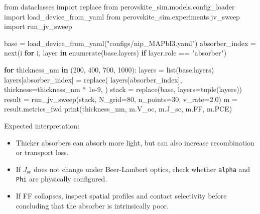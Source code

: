 \documentclass[
  11pt,
  american,
]{report}
\newenvironment{Shaded}{}{}
\newcommand{\BuiltInTok}[1]{#1}
\newcommand{\ControlFlowTok}[1]{\textcolor[rgb]{0.00,0.44,0.13}{\textbf{#1}}}
\newcommand{\DecValTok}[1]{\textcolor[rgb]{0.25,0.63,0.44}{#1}}
\newcommand{\FloatTok}[1]{\textcolor[rgb]{0.25,0.63,0.44}{#1}}
\newcommand{\ImportTok}[1]{#1}
\newcommand{\KeywordTok}[1]{\textcolor[rgb]{0.00,0.44,0.13}{\textbf{#1}}}
\newcommand{\NormalTok}[1]{#1}
\newcommand{\OperatorTok}[1]{\textcolor[rgb]{0.40,0.40,0.40}{#1}}
\newcommand{\StringTok}[1]{\textcolor[rgb]{0.25,0.44,0.63}{#1}}
\providecommand{\tightlist}{%
  \setlength{\itemsep}{0pt}\setlength{\parskip}{0pt}}
\begin{document}
\begin{Shaded}
\begin{Highlighting}[]
\ImportTok{from}\NormalTok{ dataclasses }\ImportTok{import}\NormalTok{ replace}
\ImportTok{from}\NormalTok{ perovskite\_sim.models.config\_loader }\ImportTok{import}\NormalTok{ load\_device\_from\_yaml}
\ImportTok{from}\NormalTok{ perovskite\_sim.experiments.jv\_sweep }\ImportTok{import}\NormalTok{ run\_jv\_sweep}

\NormalTok{base }\OperatorTok{=}\NormalTok{ load\_device\_from\_yaml(}\StringTok{"configs/nip\_MAPbI3.yaml"}\NormalTok{)}
\NormalTok{absorber\_index }\OperatorTok{=} \BuiltInTok{next}\NormalTok{(i }\ControlFlowTok{for}\NormalTok{ i, layer }\KeywordTok{in} \BuiltInTok{enumerate}\NormalTok{(base.layers)}
                      \ControlFlowTok{if}\NormalTok{ layer.role }\OperatorTok{==} \StringTok{"absorber"}\NormalTok{)}

\ControlFlowTok{for}\NormalTok{ thickness\_nm }\KeywordTok{in}\NormalTok{ (}\DecValTok{200}\NormalTok{, }\DecValTok{400}\NormalTok{, }\DecValTok{700}\NormalTok{, }\DecValTok{1000}\NormalTok{):}
\NormalTok{    layers }\OperatorTok{=} \BuiltInTok{list}\NormalTok{(base.layers)}
\NormalTok{    layers[absorber\_index] }\OperatorTok{=}\NormalTok{ replace(}
\NormalTok{        layers[absorber\_index],}
\NormalTok{        thickness}\OperatorTok{=}\NormalTok{thickness\_nm }\OperatorTok{*} \FloatTok{1e{-}9}\NormalTok{,}
\NormalTok{    )}
\NormalTok{    stack }\OperatorTok{=}\NormalTok{ replace(base, layers}\OperatorTok{=}\BuiltInTok{tuple}\NormalTok{(layers))}
\NormalTok{    result }\OperatorTok{=}\NormalTok{ run\_jv\_sweep(stack, N\_grid}\OperatorTok{=}\DecValTok{80}\NormalTok{, n\_points}\OperatorTok{=}\DecValTok{30}\NormalTok{, v\_rate}\OperatorTok{=}\FloatTok{2.0}\NormalTok{)}
\NormalTok{    m }\OperatorTok{=}\NormalTok{ result.metrics\_fwd}
    \BuiltInTok{print}\NormalTok{(thickness\_nm, m.V\_oc, m.J\_sc, m.FF, m.PCE)}
\end{Highlighting}
\end{Shaded}

Expected interpretation:

\begin{itemize}
\tightlist
\item
  Thicker absorbers can absorb more light, but can also increase
  recombination or transport loss.
\item
  If \(J_\mathrm{sc}\) does not change under Beer-Lambert optics, check
  whether \texttt{alpha} and \texttt{Phi} are physically configured.
\item
  If FF collapses, inspect spatial profiles and contact selectivity
  before concluding that the absorber is intrinsically poor.
\end{itemize}
\end{document}
